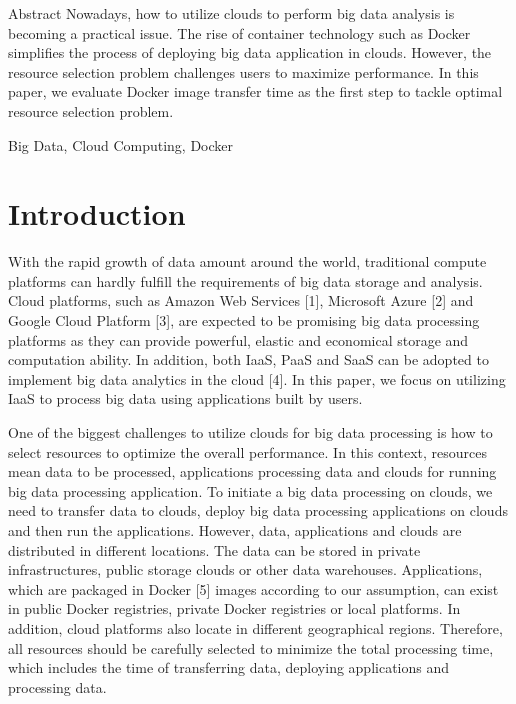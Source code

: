 \documentclass{ieicej}
\begin{document}

\begin{eabstract}
Abstract  Nowadays, how to utilize clouds to perform big data analysis is becoming a practical issue. The rise of container technology such as Docker simplifies the process of deploying big data application in clouds. However, the resource selection problem challenges users to maximize performance. In this paper, we evaluate Docker image transfer time as the first step to tackle optimal resource selection problem.
\end{eabstract}
\begin{ekeyword}
Big Data, Cloud Computing, Docker
\end{ekeyword}
\maketitle

\section{Introduction}
With the rapid growth of data amount around the world, traditional compute platforms can hardly fulfill the requirements of big data storage and analysis. Cloud platforms, such as Amazon Web Services [1], Microsoft Azure [2] and Google Cloud Platform [3], are expected to be promising big data processing platforms as they can provide powerful, elastic and economical storage and computation ability. In addition, both IaaS, PaaS and SaaS can be adopted to implement big data analytics in the cloud [4]. In this paper, we focus on utilizing IaaS to process big data using applications built by users.


One of the biggest challenges to utilize clouds for big data processing is how to select resources to optimize the overall performance. In this context, resources mean data to be processed, applications processing data and clouds for running big data processing application. To initiate a big data processing on clouds, we need to transfer data to clouds, deploy big data processing applications on clouds and then run the applications. However, data, applications and clouds are distributed in different locations. The data can be stored in private infrastructures, public storage clouds or other data warehouses. Applications, which are packaged in Docker [5] images according to our assumption, can exist in public Docker registries, private Docker registries or local platforms. In addition, cloud platforms also locate in different geographical regions. Therefore, all resources should be carefully selected to minimize the total processing time, which includes the time of transferring data, deploying applications and processing data.
\end{document}
